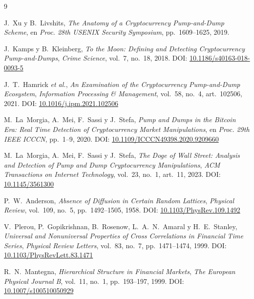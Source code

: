\begin{thebibliography}{9}

J.~Xu y B.~Livshits,
\textit{The Anatomy of a Cryptocurrency Pump-and-Dump Scheme},
en \textit{Proc. 28th USENIX Security Symposium},
pp.~1609--1625, 2019.

J.~Kamps y B.~Kleinberg,
\textit{To the Moon: Defining and Detecting Cryptocurrency Pump-and-Dumps},
\textit{Crime Science}, vol.~7, no.~18, 2018.
DOI: \href{https://doi.org/10.1186/s40163-018-0093-5}{10.1186/s40163-018-0093-5}

J.~T.~Hamrick \textit{et al.},
\textit{An Examination of the Cryptocurrency Pump-and-Dump Ecosystem},
\textit{Information Processing \& Management}, vol.~58, no.~4, art.~102506, 2021.
DOI: \href{https://doi.org/10.1016/j.ipm.2021.102506}{10.1016/j.ipm.2021.102506}

M.~La~Morgia, A.~Mei, F.~Sassi y J.~Stefa,
\textit{Pump and Dumps in the Bitcoin Era: Real Time Detection of
Cryptocurrency Market Manipulations},
en \textit{Proc. 29th IEEE ICCCN}, pp.~1--9, 2020.
DOI: \href{https://doi.org/10.1109/ICCCN49398.2020.9209660}{10.1109/ICCCN49398.2020.9209660}

M.~La~Morgia, A.~Mei, F.~Sassi y J.~Stefa,
\textit{The Doge of Wall Street: Analysis and Detection of Pump and Dump
Cryptocurrency Manipulations},
\textit{ACM Transactions on Internet Technology}, vol.~23, no.~1, art.~11, 2023.
DOI: \href{https://doi.org/10.1145/3561300}{10.1145/3561300}

P.~W.~Anderson,
\textit{Absence of Diffusion in Certain Random Lattices},
\textit{Physical Review}, vol.~109, no.~5, pp.~1492--1505, 1958.
DOI: \href{https://doi.org/10.1103/PhysRev.109.1492}{10.1103/PhysRev.109.1492}

V.~Plerou, P.~Gopikrishnan, B.~Rosenow, L.~A.~N.~Amaral y H.~E.~Stanley,
\textit{Universal and Nonuniversal Properties of Cross Correlations in
Financial Time Series},
\textit{Physical Review Letters}, vol.~83, no.~7, pp.~1471--1474, 1999.
DOI: \href{https://doi.org/10.1103/PhysRevLett.83.1471}{10.1103/PhysRevLett.83.1471}

R.~N.~Mantegna,
\textit{Hierarchical Structure in Financial Markets},
\textit{The European Physical Journal B}, vol.~11, no.~1, pp.~193--197, 1999.
DOI: \href{https://doi.org/10.1007/s100510050929}{10.1007/s100510050929}


\end{thebibliography}
